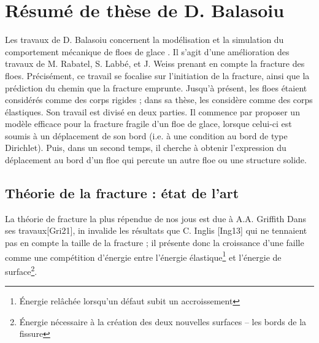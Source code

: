 
\section{Résumé de thèse de D. Balasoiu}

Les travaux de D. Balasoiu concernent la modélisation et la simulation du comportement mécanique de floes de glace \parencite{balasoiu2020thesis}. Il s'agit d'une amélioration des travaux de M. Rabatel, S. Labbé, et J. Weiss \parencite{rabatel2015thesis,rabatel2015dynamics} prenant en compte la fracture des floes. Précisément, ce travail se focalise sur l’initiation de la fracture, ainsi que la prédiction du chemin que la fracture emprunte. Jusqu’à présent, les floes étaient considérés comme des corps rigides ; dans sa thèse, \citeauthor{balasoiu2020thesis} les considère comme des corps élastiques. Son travail est divisé en deux parties. Il commence par proposer un modèle efficace pour la fracture fragile d’un floe de glace, lorsque celui-ci est soumis à un déplacement de son bord (i.e. à une condition au bord de type Dirichlet). Puis, dans un second temps, il cherche à obtenir l’expression du déplacement au bord d’un floe qui percute un autre floe ou une structure solide.

\subsection{Théorie de la fracture : état de l’art} 
 
La théorie de fracture la plus répendue de nos jous est due à A.A. Griffith  Dans ses travaux[Gri21], in invalide les résultats que C. Inglis [Ing13] qui ne tennaient pas en compte la taille de la fracture ; il présente donc la croissance d'une faille comme une compétition d'énergie entre l'énergie élastique\footnote{Énergie relâchée lorsqu’un défaut subit un accroissement} et l'énergie de surface\footnote{Énergie nécessaire à la création des deux nouvelles surfaces – les bords de la fissure}. 

